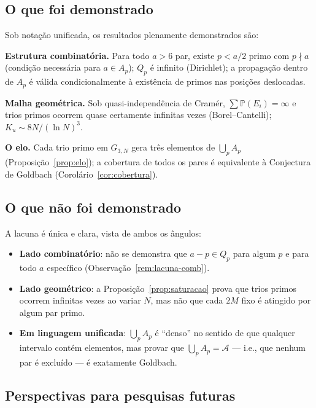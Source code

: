\documentclass[12pt,a4paper]{article}
\theoremstyle{remark}
\newcommand{\calA}{\mathcal{A}}
\newcommand{\bP}{\mathbb{P}}
\begin{document}
	\subsection{O que foi demonstrado}
	
	Sob nota\c{c}\~ao unificada, os resultados plenamente demonstrados s\~ao:
	
	\textbf{Estrutura combinat\'oria.}
	Para todo $a>6$ par, existe $p<a/2$ primo com $p\nmid a$ (condi\c{c}\~ao necess\'aria
	para $a\in A_p$); $Q_p$ \'e infinito (Dirichlet); a propaga\c{c}\~ao dentro de $A_p$
	\'e v\'alida condicionalmente \`a exist\^encia de primos nas posi\c{c}\~oes deslocadas.
	
	\textbf{Malha geom\'etrica.}
	Sob quasi-independ\^encia de Cram\'er, $\sum\bP(E_i)=\infty$ e trios primos ocorrem
	quase certamente infinitas vezes (Borel--Cantelli); $K_u\sim 8N/(\ln N)^3$.
	
	\textbf{O elo.}
	Cada trio primo em $G_{3,N}$ gera tr\^es elementos de $\bigcup_p A_p$
	(Proposi\c{c}\~ao~\ref{prop:elo}); a cobertura de todos os pares \'e equivalente
	\`a Conjectura de Goldbach (Corol\'ario~\ref{cor:cobertura}).
	
	\subsection{O que não foi demonstrado}
	
	A lacuna \'e \'unica e clara, vista de ambos os \^angulos:
	
	\begin{itemize}
		\item \textbf{Lado combinat\'orio}: n\~ao se demonstra que $a-p\in Q_p$
		para algum $p$ e para todo $a$ espec\'ifico
		(Observa\c{c}\~ao~\ref{rem:lacuna-comb}).
		
		\item \textbf{Lado geom\'etrico}: a Proposi\c{c}\~ao~\ref{prop:saturacao}
		prova que trios primos ocorrem infinitas vezes ao variar $N$,
		mas n\~ao que cada $2M$ fixo \'e atingido por algum par primo.
		
		\item \textbf{Em linguagem unificada}: $\bigcup_p A_p$ \'e ``denso''
		no sentido de que qualquer intervalo cont\'em elementos,
		mas provar que $\bigcup_p A_p = \calA$ --- i.e., que nenhum par \'e exclu\'ido
		--- \'e exatamente Goldbach.
	\end{itemize}
	
	\subsection{Perspectivas para pesquisas futuras}
	
\end{document}
